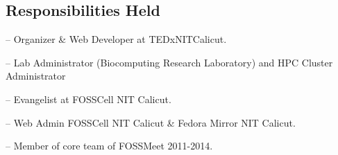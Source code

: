 \documentclass[margin,line]{resume}
\begin{document}
\begin{resume}
    \section{\mysidestyle Responsibilities Held } 
	\begin{list2}
	\item[--] Organizer \& Web Developer at TEDxNITCalicut.
	\item[--] Lab Administrator (Biocomputing Research Laboratory) and HPC Cluster Administrator
	\item[--] Evangelist at FOSSCell NIT Calicut.	
	\item[--] Web Admin FOSSCell NIT Calicut \& Fedora Mirror NIT Calicut.
	\item[--] Member of core team of FOSSMeet 2011-2014.
	
	
	\end{list2}
%
%



\end{resume}
\end{document}
